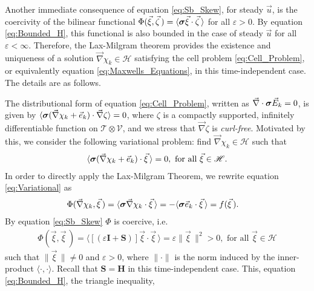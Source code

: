 \documentclass[11pt]{amsart}
\newcommand{\Hb}{\mathbf{H}}
\newcommand{\Ib}{\mathbf{I}}
\newcommand{\Sb}{\mathbf{S}}
\newcommand{\Tc}{\mathcal{T}}
\newcommand{\Vc}{\mathcal{V}}
\newcommand{\Hs}{\mathscr{H}}
\newcommand\bsig{\mbox{\boldmath${\sigma}$}}
\begin{document}
Another immediate consequence of equation \eqref{eq:Sb_Skew}, for
steady $\vec{u}$, is the coercivity of the bilinear functional
$\Phi(\vec{\xi},\vec{\zeta}\,)=\langle\bsig\vec{\xi}\cdot\vec{\zeta}\,\rangle$ for all $\varepsilon>0$. By equation
\eqref{eq:Bounded_H}, this functional is also bounded in the case of
steady $\vec{u}$ for all $\varepsilon<\infty$. Therefore, the Lax-Milgram theorem
\cite{McOwen:2003:PDE} provides the existence and uniqueness of a
solution $\vec{\nabla}\chi_k\in\Hs$ satisfying the cell problem
\eqref{eq:Cell_Problem}, or equivalently equation
\eqref{eq:Maxwells_Equations}, in this time-independent case. The
details are as follows. 




The distributional form of equation \eqref{eq:Cell_Problem}, written
as $\vec{\nabla}\cdot\bsig\vec{E}_k=0$, is given by
$\langle\bsig(\vec{\nabla}\chi_k+\vec{e}_k)\cdot\vec{\nabla}\zeta\rangle=0$, where $\zeta$ is a compactly
supported, infinitely differentiable function on $\Tc\otimes\Vc$, and we
stress that $\vec{\nabla}\zeta$ is \emph{curl-free}. Motivated by this, we
consider the following variational problem: find $\vec{\nabla}\chi_k\in\Hs$ such
that   
%
\begin{align}\label{eq:Variational}
  \langle\bsig(\vec{\nabla}\chi_k+\vec{e}_k)\cdot\vec{\xi}\,\rangle=0, \text{ for all }
  \vec{\xi}\in\Hs.
\end{align}
%
In order to directly apply the Lax-Milgram Theorem, we rewrite
equation \eqref{eq:Variational} as 
%
\begin{align}  \label{eq:Bilinear_functional_E} 
   &\Phi(\vec{\nabla}\chi_k,\vec{\xi}\,)
     =\langle\bsig\vec{\nabla}\chi_k\cdot\vec{\xi}\,\rangle
     =-\langle\bsig\vec{e}_k\cdot\vec{\xi}\,\rangle
     =f(\vec{\xi}\,). 
\end{align}
%
By equation \eqref{eq:Sb_Skew} $\Phi$ is coercive, i.e.
%
\begin{align}\label{eq:Phi_Coercive}
  \Phi(\vec{\xi},\vec{\xi}\,)=\langle[(\varepsilon\Ib+\Sb)]\vec{\xi}\cdot\vec{\xi}\,\rangle=\varepsilon\|\vec{\xi}\,\|^2>0,
   \text{ for all } \vec{\xi}\in\Hs
\end{align}
%
such that $\|\vec{\xi}\,\|\neq0$ and $\varepsilon>0$, where $\|\cdot\|$
is the norm induced by the inner-product $\langle\cdot,\cdot\rangle$. Recall that
$\Sb=\Hb$ in this time-independent case. This, equation 
\eqref{eq:Bounded_H}, the triangle inequality,
\end{document}
